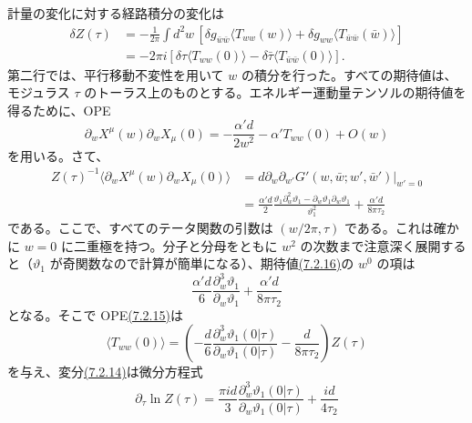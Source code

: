 計量の変化に対する経路積分の変化は
\begin{equation}
\begin{aligned}
\delta Z(\tau)
&=-\frac1{2\pi}\int d^2w\,
\left[\delta g_{\bar w\bar w}\langle T_{ww}(w)\rangle
+\delta g_{ww}\langle T_{\bar w\bar w}(\bar w)\rangle\right]\\
&=-2\pi i\left[
\delta\tau\langle T_{ww}(0)\rangle
-\delta\bar\tau\langle T_{\bar w\bar w}(0)\rangle\right].
\end{aligned}
\tag{7.2.14}\label{eq:7.2.14}
\end{equation}
第二行では、平行移動不変性を用いて $w$ の積分を行った。すべての期待値は、モジュラス $\tau$ のトーラス上のものとする。エネルギー運動量テンソルの期待値を得るために、OPE
\begin{equation}
\partial_wX^\mu(w)\partial_wX_\mu(0)
=-\frac{\alpha'd}{2w^2}-\alpha'T_{ww}(0)+O(w)
\tag{7.2.15}\label{eq:7.2.15}
\end{equation}
を用いる。さて、
\begin{equation}
\begin{aligned}
Z(\tau)^{-1}\langle\partial_wX^\mu(w)\partial_wX_\mu(0)\rangle
&=d\left.\partial_w\partial_{w'}G'(w,\bar w;w',\bar w')\right|_{w'=0}\\
&=\frac{\alpha'd}{2}
\frac{\vartheta_1\partial_w^2\vartheta_1
-\partial_w\vartheta_1\partial_w\vartheta_1}{\vartheta_1^2}
+\frac{\alpha'd}{8\pi\tau_2}
\end{aligned}
\tag{7.2.16}\label{eq:7.2.16}
\end{equation}
である。ここで、すべてのテータ関数の引数は $(w/2\pi,\tau)$ である。これは確かに $w=0$ に二重極を持つ。分子と分母をともに $w^2$ の次数まで注意深く展開すると（$\vartheta_1$ が奇関数なので計算が簡単になる）、期待値\hyperref[eq:7.2.16]{(7.2.16)}の $w^0$ の項は
\begin{equation}
\frac{\alpha'd}{6}\frac{\partial_w^3\vartheta_1}{\partial_w\vartheta_1}
+\frac{\alpha'd}{8\pi\tau_2}
\tag{7.2.17}\label{eq:7.2.17}
\end{equation}
となる。そこで OPE\hyperref[eq:7.2.15]{(7.2.15)}は
\begin{equation}
\langle T_{ww}(0)\rangle
=\left(-\frac d6\frac{\partial_w^3\vartheta_1(0|\tau)}
{\partial_w\vartheta_1(0|\tau)}
-\frac d{8\pi\tau_2}\right)Z(\tau)
\tag{7.2.18}\label{eq:7.2.18}
\end{equation}
を与え、変分\hyperref[eq:7.2.14]{(7.2.14)}は微分方程式
\begin{equation}
\partial_\tau\ln Z(\tau)
=\frac{\pi id}{3}
\frac{\partial_w^3\vartheta_1(0|\tau)}{\partial_w\vartheta_1(0|\tau)}
+\frac{id}{4\tau_2}
\tag{7.2.19}\label{eq:7.2.19}
\end{equation}
